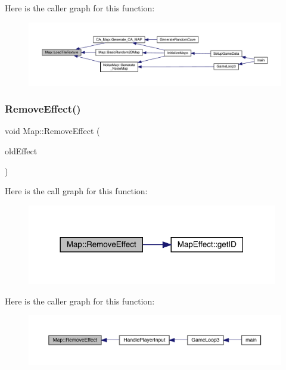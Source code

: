 Here is the caller graph for this function\+:
\nopagebreak
\begin{figure}[H]
\begin{center}
\leavevmode
\includegraphics[width=350pt]{dd/d11/class_map_ab64e7930cd811d847dbbee056b1e2fb0_icgraph}
\end{center}
\end{figure}
\mbox{\label{class_map_a0165980338b5bb5739a05dee4d4b341b}} 
\subsubsection{\texorpdfstring{Remove\+Effect()}{RemoveEffect()}}
{\footnotesize\ttfamily void Map\+::\+Remove\+Effect (\begin{DoxyParamCaption}\item[{\mbox{\hyperlink{class_map_effect}{Map\+Effect}}}]{old\+Effect }\end{DoxyParamCaption})}

Here is the call graph for this function\+:
\nopagebreak
\begin{figure}[H]
\begin{center}
\leavevmode
\includegraphics[width=310pt]{dd/d11/class_map_a0165980338b5bb5739a05dee4d4b341b_cgraph}
\end{center}
\end{figure}
Here is the caller graph for this function\+:
\nopagebreak
\begin{figure}[H]
\begin{center}
\leavevmode
\includegraphics[width=350pt]{dd/d11/class_map_a0165980338b5bb5739a05dee4d4b341b_icgraph}
\end{center}
\end{figure}
\mbox{\label{class_map_a2b24578b19c64fd8bc94ab2f36ffb9fc}} 
